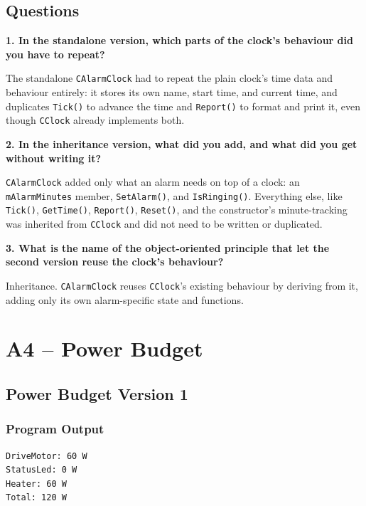 \documentclass[10pt,a4paper]{article}
\newcommand{\question}[1]{%
    \vspace{5pt}
    \textbf{#1}\par
    \vspace{2pt}
}
\begin{document}
\subsection{Questions}

\question{1. In the standalone version, which parts of the clock's behaviour did you have to repeat?}

The standalone \texttt{CAlarmClock} had to repeat the plain clock's time
data and behaviour entirely: it stores its own name, start time, and
current time, and duplicates \texttt{Tick()} to advance the time and
\texttt{Report()} to format and print it, even though \texttt{CClock}
already implements both.

\question{2. In the inheritance version, what did you add, and what did you get without writing it?}

\texttt{CAlarmClock} added only what an alarm needs on top of a clock: an
\texttt{mAlarmMinutes} member, \texttt{SetAlarm()}, and \texttt{IsRinging()}.
Everything else, like \texttt{Tick()}, \texttt{GetTime()}, \texttt{Report()},
\texttt{Reset()}, and the constructor's minute-tracking was inherited
from \texttt{CClock} and did not need to be written or duplicated.

\question{3. What is the name of the object-oriented principle that let the second version reuse the clock's behaviour?}

Inheritance. \texttt{CAlarmClock} reuses \texttt{CClock}'s existing
behaviour by deriving from it, adding only its own alarm-specific state
and functions.

\newpage
\section{A4 -- Power Budget}

\subsection{Power Budget Version 1}

\subsubsection{Program Output}

\begin{lstlisting}[style=output]
DriveMotor: 60 W
StatusLed: 0 W
Heater: 60 W
Total: 120 W
\end{lstlisting}
\end{document}
